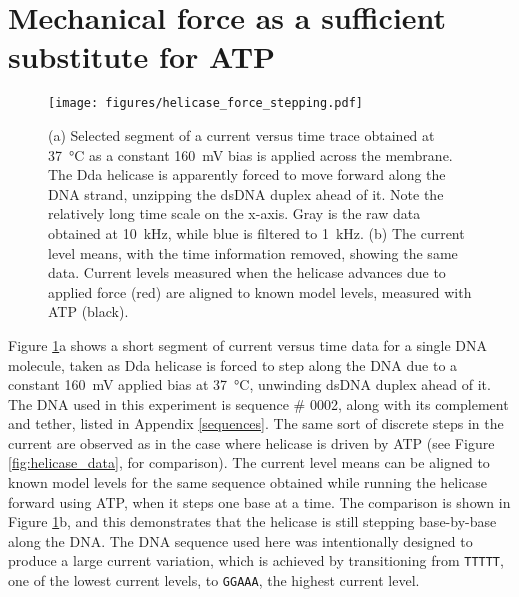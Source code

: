 \section{Mechanical force as a sufficient substitute for ATP}

\begin{figure}[H]
\begin{centering}
\texttt{[image: figures/helicase\_force\_stepping.pdf]}
\caption[Mechanical force substitutes for ATP and moves helicase]{(a) Selected segment of a current versus time trace obtained at \SI{37}{\celsius} as a constant \SI{160}{\mV} bias is applied across the membrane.  The Dda helicase is apparently forced to move forward along the DNA strand, unzipping the dsDNA duplex ahead of it.  Note the relatively long time scale on the x-axis.  Gray is the raw data obtained at \SI{10}{\kHz}, while blue is filtered to \SI{1}{\kHz}.  (b) The current level means, with the time information removed, showing the same data.  Current levels measured when the helicase advances due to applied force (red) are aligned to known model levels, measured with ATP (black).}
\label{fig:helicase_force_stepping}
\end{centering}
\end{figure}

Figure \ref{fig:helicase_force_stepping}a shows a short segment of current versus time data for a single DNA molecule, taken as Dda helicase is forced to step along the DNA due to a constant \SI{160}{\mV} applied bias at \SI{37}{\celsius}, unwinding dsDNA duplex ahead of it.  The DNA used in this experiment is sequence \# 0002, along with its complement and tether, listed in Appendix \ref{sequences}.  The same sort of discrete steps in the current are observed as in the case where helicase is driven by ATP (see Figure \ref{fig:helicase_data}, for comparison).  The current level means can be aligned to known model levels for the same sequence obtained while running the helicase forward using ATP, when it steps one base at a time.  The comparison is shown in Figure \ref{fig:helicase_force_stepping}b, and this demonstrates that the helicase is still stepping base-by-base along the DNA.  The DNA sequence used here was intentionally designed to produce a large current variation, which is achieved by transitioning from \texttt{TTTTT}, one of the lowest current levels, to \texttt{GGAAA}, the highest current level.

